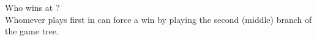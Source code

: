 \documentclass[11pt, reqno]{amsart}
\begin{document}
\begin{problem}[5]
\begin{enumalph}
    \item Who wins at \cram? \\
      Whomever plays first in \cram can force a win
      by playing the second (middle) branch of the game tree.
  \end{enumalph}
\end{problem}
\end{document}
